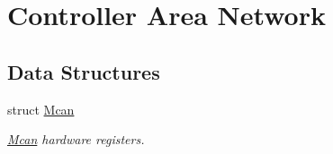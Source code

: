 \hypertarget{group__SAMV71__MCAN}{}\section{Controller Area Network}
\label{group__SAMV71__MCAN}
\subsection*{Data Structures}
\begin{DoxyCompactItemize}
\item 
struct \mbox{\hyperlink{structMcan}{Mcan}}
\begin{DoxyCompactList}\small\item\em \mbox{\hyperlink{structMcan}{Mcan}} hardware registers. \end{DoxyCompactList}\end{DoxyCompactItemize}
